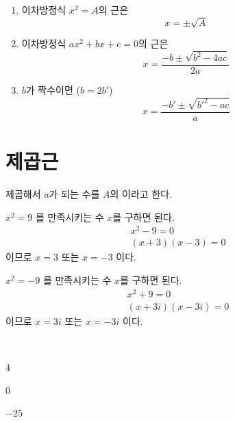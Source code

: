 \documentclass{oblivoir}
\begin{document}
\begin{mdframed}[frametitle={이차방정식의 풀이}]
\begin{enumerate}\label{review4}
\item
이차방정식 \(x^2=A\)의 근은
\[x=\pm\sqrt A\]
\item
이차방정식 \(ax^2+bx+c=0\)의 근은
\[x=\frac{-b\pm\sqrt{b^2-4ac}}{2a}\]
\item
\(b\)가 짝수이면 (\(b=2b'\))
\[x=\frac{-b'\pm\sqrt{b'^2-ac}}a\]
\end{enumerate}
\end{mdframed}

%
\section{제곱근}
%
\begin{mdframed}
\label{sqroot1}
제곱해서 \(a\)가 되는 수를 \(A\)의 이라고 한다.
\end{mdframed}

%
\label{sqroot2}
\vspace{-10pt}
\begin{mdframed}
\(x^2=9\)
를 만족시키는 수 \(x\)를 구하면 된다.
\begin{gather*}
x^2-9		=0\\
(x+3)(x-3)	=0
\end{gather*}
이므로 \(x=3\) 또는 \(x=-3\) 이다.
\end{mdframed}

%
\label{sqroot3}
\vspace{-10pt}
\begin{mdframed}
\(x^2=-9\)
를 만족시키는 수 \(x\)를 구하면 된다.
\begin{gather*}
x^2+9		=0\\
(x+3i)(x-3i)	=0
\end{gather*}
이므로 \(x=3i\) 또는 \(x=-3i\) 이다.
\end{mdframed}

%
\label{sqroot4}
\\[-10pt]
\begin{enumerate*}[itemjoin=\hspace{0.25\textwidth}]
\item
4
\item
0
\item
\(-25\)
\end{enumerate*}
\end{document}
